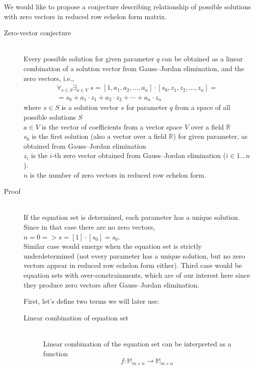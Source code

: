 We would like to propose a conjecture describing relationship of possible solutions with zero vectors in reduced row echelon form matrix.
\begin{description}
	\item[Zero-vector conjecture] \hfill \\
        Every possible solution for given parameter $q$ can be obtained as a linear combination of a solution vector from Gauss--Jordan elimination, and the zero vectors, i.e.,
    {\large
    \begin{equation}
    \begin{matrix}
        \forall_{s \in S} \displaystyle\exists_{a \in V} \; s = [1,a_1,a_2,\ldots,a_n]\cdot[s_0,z_1,z_2,\ldots,z_n]=\\=s_0 + a_1 \cdot z_1 + a_2 \cdot z_2 +\cdots+a_n \cdot z_n
    \end{matrix}
    \end{equation}
    }
    where $s \in S$ is a solution vector $s$ for parameter $q$ from a space of all possible solutions $S$ \\
    $a \in V$ is the vector of coefficients from a vector space $V$ over a field $\mathbb{R}$ \\
    $s_0$ is the first solution (also a vector over a field $\mathbb{R}$) for given parameter, as obtained from Gauss--Jordan elimination \\
    $z_i$ is the $i$-th zero vector obtained from Gauss--Jordan elimination ($i \in 1\ldots n$). \\
    $n$ is the number of zero vectors in reduced row echelon form.
	\item[Proof] \hfill \\
    If the equation set is determined, each parameter has a unique solution. Since in that case there are no zero vectors, $n=0 => s = [1] \cdot [s_0] = s_0$.\\
    Similar case would emerge when the equation set is strictly underdetermined (not every parameter has a unique solution, but no zero vectors appear in reduced row echelon form either).
    Third case would be equation sets with over-constrainments, which are of our interest here since they produce zero vectors after Gauss--Jordan elimination.

    First, let's define two terms we will later use:

    \begin{description}
    	\item[Linear combination of equation set] \hfill \\
            Linear combination of the equation set can be interpreted as a function
            {\large
            \begin{equation}
                f: \mathbb{M}_{m \times n} \to \mathbb{M}_{m \times n}
            \end{equation}
            }


\end{description}
\end{description}
